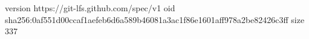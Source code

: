 version https://git-lfs.github.com/spec/v1
oid sha256:0af551d00ccaf1aefeb6d6a589b46081a3ac1f86e1601aff978a2be82426c3ff
size 337
